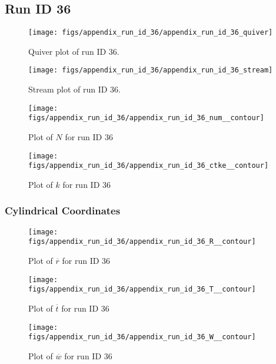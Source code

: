 \subsection{Run ID 36}
\begin{figure}[H]
\centering
\texttt{[image: figs/appendix\_run\_id\_36/appendix\_run\_id\_36\_quiver]}
\caption{Quiver plot of run ID 36.}
\label{fig:appendix_run_id_36_quiver}
\end{figure}


\begin{figure}[H]
\centering
\texttt{[image: figs/appendix\_run\_id\_36/appendix\_run\_id\_36\_stream]}
\caption{Stream plot of run ID 36.}
\label{fig:appendix_run_id_36_stream}
\end{figure}


\begin{figure}[H]
\centering
\texttt{[image: figs/appendix\_run\_id\_36/appendix\_run\_id\_36\_num\_\_contour]}
\caption{Plot of $N$ for run ID 36}
\label{fig:appendix_run_id_36_num__contour}
\end{figure}


\begin{figure}[H]
\centering
\texttt{[image: figs/appendix\_run\_id\_36/appendix\_run\_id\_36\_ctke\_\_contour]}
\caption{Plot of $k$ for run ID 36}
\label{fig:appendix_run_id_36_ctke__contour}
\end{figure}


\subsubsection{Cylindrical Coordinates}
\begin{figure}[H]
\centering
\texttt{[image: figs/appendix\_run\_id\_36/appendix\_run\_id\_36\_R\_\_contour]}
\caption{Plot of $\overline{r}$ for run ID 36}
\label{fig:appendix_run_id_36_R__contour}
\end{figure}


\begin{figure}[H]
\centering
\texttt{[image: figs/appendix\_run\_id\_36/appendix\_run\_id\_36\_T\_\_contour]}
\caption{Plot of $\overline{t}$ for run ID 36}
\label{fig:appendix_run_id_36_T__contour}
\end{figure}


\begin{figure}[H]
\centering
\texttt{[image: figs/appendix\_run\_id\_36/appendix\_run\_id\_36\_W\_\_contour]}
\caption{Plot of $\overline{w}$ for run ID 36}
\label{fig:appendix_run_id_36_W__contour}
\end{figure}


